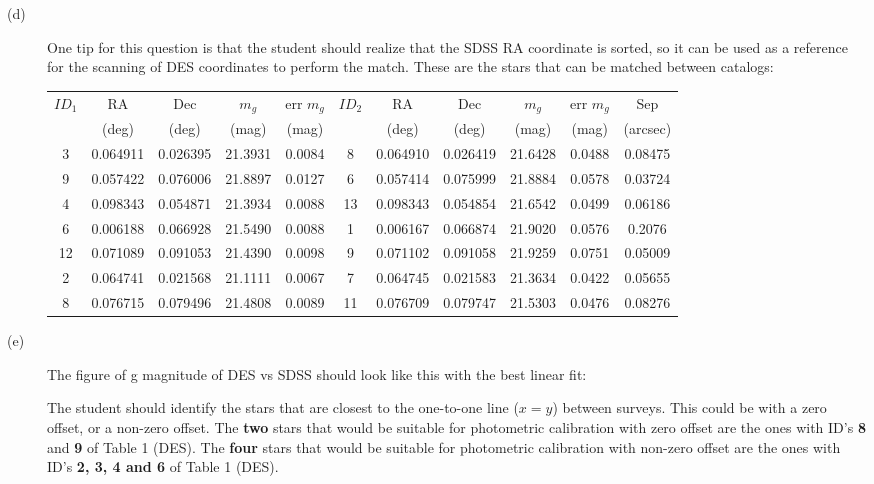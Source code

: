 \begin{description}
\item[(d)] One tip for this question is that the student should realize
that the SDSS RA coordinate is sorted, so it can be used as a reference for
the scanning of DES coordinates to perform the match. These are the stars
that can be matched between catalogs:

\begin{center}
\begin{tabular}{ccccc|ccccc|c}
$ID_1$ & RA & Dec & $m_g$ & err $m_g$ &
$ID_2$ & RA & Dec & $m_g$ & err $m_g$ & Sep \\
 & (deg) & (deg) & (mag) & (mag) &
 & (deg) & (deg) & (mag) & (mag) & (arcsec) \\
\hline
3 & 0.064911 & 0.026395 & 21.3931 & 0.0084 & 8 & 0.064910 & 0.026419 & 21.6428 & 0.0488 & 0.08475 \\
9 & 0.057422 & 0.076006 & 21.8897 & 0.0127 & 6 & 0.057414 & 0.075999 & 21.8884 & 0.0578 & 0.03724 \\
4 & 0.098343 & 0.054871 & 21.3934 & 0.0088 & 13 & 0.098343 & 0.054854 & 21.6542 & 0.0499 & 0.06186 \\
6 & 0.006188 & 0.066928 & 21.5490 & 0.0088 & 1 & 0.006167 & 0.066874 & 21.9020 & 0.0576 & 0.2076 \\
12 & 0.071089 & 0.091053 & 21.4390 & 0.0098 & 9 & 0.071102 & 0.091058 & 21.9259 & 0.0751 & 0.05009 \\
2 & 0.064741 & 0.021568 & 21.1111 & 0.0067 & 7 & 0.064745 & 0.021583 & 21.3634 & 0.0422 & 0.05655 \\
8 & 0.076715 & 0.079496 & 21.4808 & 0.0089 & 11 & 0.076709 & 0.079747 & 21.5303 & 0.0476 & 0.08276 \\
\end{tabular}
\end{center}

\item[(e)] The figure of g magnitude of DES vs SDSS should look like this
with the best linear fit:


The student should identify the stars that are closest to the one-to-one
line ($x = y$) between surveys. This could be with a zero offset, or a
non-zero offset. The \textbf{two} stars that would be suitable for
photometric calibration with zero offset are the ones with ID's \textbf{8}
and \textbf{9} of Table 1 (DES). The \textbf{four} stars that would be
suitable for photometric calibration with non-zero offset are the ones with
ID's \textbf{2, 3, 4 and 6} of Table 1 (DES).
\end{description}

